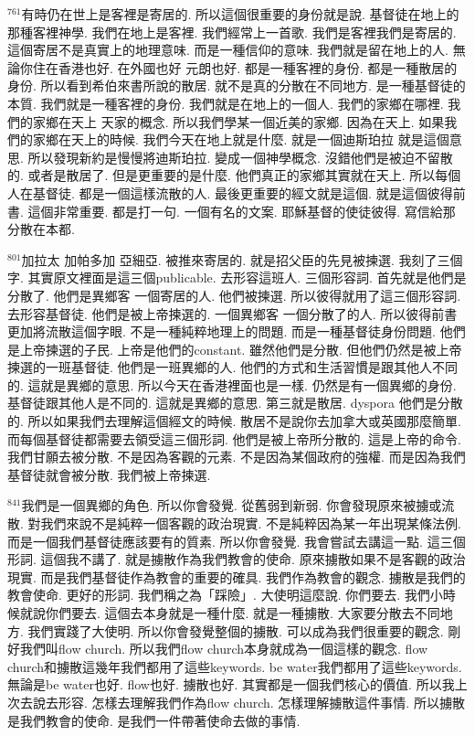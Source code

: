 \documentclass{book}
\begin{document}
$^{761}$有時仍在世上是客裡是寄居的.
所以這個很重要的身份就是說.
基督徒在地上的那種客裡神學.
我們在地上是客裡.
我們經常上一首歌.
我們是客裡我們是寄居的.
這個寄居不是真實上的地理意味.
而是一種信仰的意味.
我們就是留在地上的人.
無論你住在香港也好.
在外國也好 元朗也好.
都是一種客裡的身份.
都是一種散居的身份.
所以看到希伯來書所說的散居.
就不是真的分散在不同地方.
是一種基督徒的本質.
我們就是一種客裡的身份.
我們就是在地上的一個人.
我們的家鄉在哪裡.
我們的家鄉在天上 天家的概念.
所以我們學某一個近美的家鄉.
因為在天上.
如果我們的家鄉在天上的時候.
我們今天在地上就是什麼.
就是一個迪斯珀拉 就是這個意思.
所以發現新約是慢慢將迪斯珀拉.
變成一個神學概念.
沒錯他們是被迫不留散的.
或者是散居了.
但是更重要的是什麼.
他們真正的家鄉其實就在天上.
所以每個人在基督徒.
都是一個這樣流散的人.
最後更重要的經文就是這個.
就是這個彼得前書.
這個非常重要.
都是打一句.
一個有名的文案.
耶穌基督的使徒彼得.
寫信給那分散在本都.

$^{801}$加拉太 加帕多加 亞細亞.
被推來寄居的.
就是招父臣的先見被揀選.
我刻了三個字.
其實原文裡面是這三個publicable.
去形容這班人.
三個形容詞.
首先就是他們是分散了.
他們是異鄉客 一個寄居的人.
他們被揀選.
所以彼得就用了這三個形容詞.
去形容基督徒.
他們是被上帝揀選的.
一個異鄉客 一個分散了的人.
所以彼得前書更加將流散這個字眼.
不是一種純粹地理上的問題.
而是一種基督徒身份問題.
他們是上帝揀選的子民.
上帝是他們的constant.
雖然他們是分散.
但他們仍然是被上帝揀選的一班基督徒.
他們是一班異鄉的人.
他們的方式和生活習慣是跟其他人不同的.
這就是異鄉的意思.
所以今天在香港裡面也是一樣.
仍然是有一個異鄉的身份.
基督徒跟其他人是不同的.
這就是異鄉的意思.
第三就是散居.
dyspora 他們是分散的.
所以如果我們去理解這個經文的時候.
散居不是說你去加拿大或英國那麼簡單.
而每個基督徒都需要去領受這三個形詞.
他們是被上帝所分散的.
這是上帝的命令.
我們甘願去被分散.
不是因為客觀的元素.
不是因為某個政府的強權.
而是因為我們基督徒就會被分散.
我們被上帝揀選.

$^{841}$我們是一個異鄉的角色.
所以你會發覺.
從舊弱到新弱.
你會發現原來被擄或流散.
對我們來說不是純粹一個客觀的政治現實.
不是純粹因為某一年出現某條法例.
而是一個我們基督徒應該要有的質素.
所以你會發覺.
我會嘗試去講這一點.
這三個形詞.
這個我不講了.
就是擄散作為我們教會的使命.
原來擄散如果不是客觀的政治現實.
而是我們基督徒作為教會的重要的確具.
我們作為教會的觀念.
擄散是我們的教會使命.
更好的形詞.
我們稱之為「踩險」.
大使明這麼說.
你們要去.
我們小時候就說你們要去.
這個去本身就是一種什麼.
就是一種擄散.
大家要分散去不同地方.
我們實踐了大使明.
所以你會發覺整個的擄散.
可以成為我們很重要的觀念.
剛好我們叫flow church.
所以我們flow church本身就成為一個這樣的觀念.
flow church和擄散這幾年我們都用了這些keywords.
be water我們都用了這些keywords.
無論是be water也好.
flow也好.
擄散也好.
其實都是一個我們核心的價值.
所以我上次去說去形容.
怎樣去理解我們作為flow church.
怎樣理解擄散這件事情.
所以擄散是我們教會的使命.
是我們一件帶著使命去做的事情.
\end{document}
